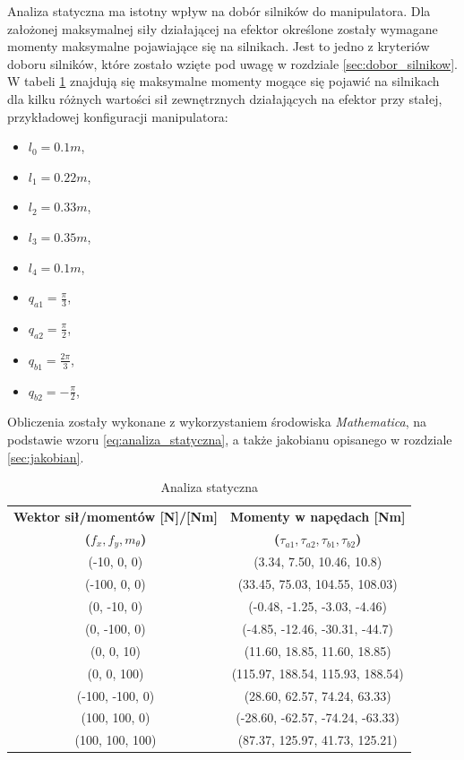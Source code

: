 \documentclass[printmode]{mgr}
\begin{document}
Analiza statyczna ma istotny wpływ na dobór silników do manipulatora. Dla założonej maksymalnej siły działającej na efektor
określone zostały wymagane momenty maksymalne pojawiające się na silnikach. Jest to jedno z kryteriów doboru silników, 
które zostało wzięte pod uwagę w rozdziale \ref{sec:dobor_silnikow}. W tabeli \ref{tab:analiza_statyczna} znajdują się
maksymalne momenty mogące się pojawić na silnikach dla kilku różnych wartości sił zewnętrznych działających na efektor
przy stałej, przykładowej konfiguracji manipulatora:
\begin{itemize}
\item $l_0=0.1m$,
\item $l_1=0.22m$,
\item $l_2=0.33m$,
\item $l_3=0.35m$,
\item $l_4=0.1m$,
\item $q_{a1}=\frac{\pi}{3}$,
\item $q_{a2}=\frac{\pi}{2}$,
\item $q_{b1}=\frac{2\pi}{3}$,
\item $q_{b2}=-\frac{\pi}{2}$,
\end{itemize}

Obliczenia zostały wykonane z wykorzystaniem środowiska \emph{Mathematica}, na podstawie wzoru \ref{eq:analiza_statyczna}, a także
jakobianu opisanego w rozdziale \ref{sec:jakobian}.

\begin{table}[tp]
  \caption{Analiza statyczna}
  \label{tab:analiza_statyczna}
  \centering
  \begin{tabular}{||c|c||}
    \hline\hline
{\bf Wektor sił/momentów [N]/[Nm]} & {\bf Momenty w napędach [Nm]} \\
{\bf ($f_x, f_y, m_{\theta}$)} & {\bf ($\tau_{a1}, \tau_{a2}, \tau_{b1}, \tau_{b2}$)} \\\hline\hline
(-10, 0, 0) & (3.34, 7.50, 10.46, 10.8) \\
(-100, 0, 0) & (33.45, 75.03, 104.55, 108.03) \\
(0, -10, 0) & (-0.48, -1.25, -3.03, -4.46) \\
(0, -100, 0) & (-4.85, -12.46, -30.31, -44.7) \\
(0, 0, 10) & (11.60, 18.85, 11.60, 18.85) \\
(0, 0, 100) & (115.97, 188.54, 115.93, 188.54) \\
(-100, -100, 0) & (28.60, 62.57, 74.24, 63.33) \\
(100, 100, 0) & (-28.60, -62.57, -74.24, -63.33) \\
(100, 100, 100) & (87.37, 125.97, 41.73, 125.21) \\
\hline\hline
  \end{tabular}
\end{table}
\end{document}

